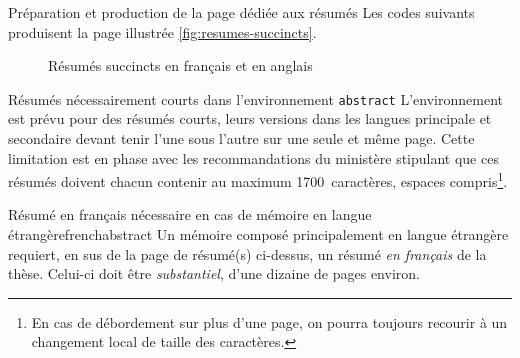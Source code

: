 \begin{dbexample}{Préparation et production de la page dédiée aux résumés}{}
  Les codes suivants produisent la page illustrée \vref{fig:resumes-succincts}.
\begin{bodycode}
\begin{abstract}
  \lipsum[1-2]
\end{abstract}
\begin{abstract}
  \lipsum[3-4]
\end{abstract}
\end{bodycode}
\end{dbexample}

\begin{figure}[htbp]
  \centering {}%
  \caption{Résumés succincts en français et en anglais}
  \label{fig:resumes-succincts}
\end{figure}

\begin{dbwarning}{Résumés nécessairement courts dans l'environnement
    \protect\lstinline+abstract+}{}
  L'environnement  est prévu pour des résumés courts, leurs
  versions dans les langues principale et secondaire devant tenir l'une sous
  l'autre sur une seule et même page. Cette limitation est en phase avec les
  recommandations du ministère stipulant que ces résumés doivent chacun
  contenir au maximum 1700~caractères, espaces compris\footnote{En cas de
    débordement sur plus d'une page, on pourra toujours recourir à un
    changement local de taille des caractères.}.
\end{dbwarning}

\begin{dbwarning}{Résumé en français nécessaire en cas de mémoire en langue
    étrangère}{frenchabstract}
  Un mémoire composé principalement en langue étrangère  requiert, en sus de la page de
  résumé(s) ci-dessus, un résumé \emph{en français} de la thèse. Celui-ci doit
  être \emph{substantiel}, d'une dizaine de pages environ.
\end{dbwarning}


